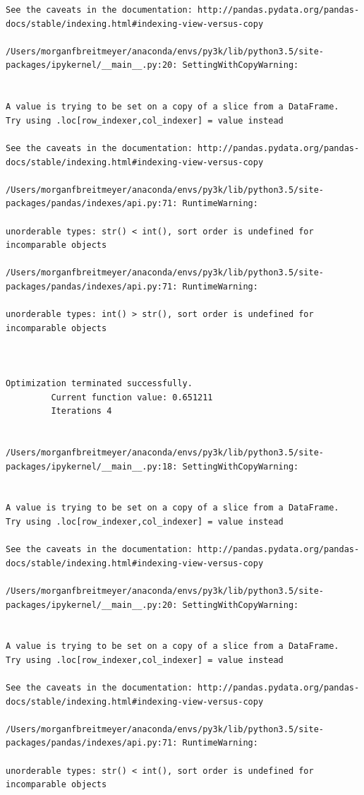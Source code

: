 \begin{lstlisting}
See the caveats in the documentation: http://pandas.pydata.org/pandas-docs/stable/indexing.html#indexing-view-versus-copy

/Users/morganfbreitmeyer/anaconda/envs/py3k/lib/python3.5/site-packages/ipykernel/__main__.py:20: SettingWithCopyWarning:


A value is trying to be set on a copy of a slice from a DataFrame.
Try using .loc[row_indexer,col_indexer] = value instead

See the caveats in the documentation: http://pandas.pydata.org/pandas-docs/stable/indexing.html#indexing-view-versus-copy

/Users/morganfbreitmeyer/anaconda/envs/py3k/lib/python3.5/site-packages/pandas/indexes/api.py:71: RuntimeWarning:

unorderable types: str() < int(), sort order is undefined for incomparable objects

/Users/morganfbreitmeyer/anaconda/envs/py3k/lib/python3.5/site-packages/pandas/indexes/api.py:71: RuntimeWarning:

unorderable types: int() > str(), sort order is undefined for incomparable objects



Optimization terminated successfully.
         Current function value: 0.651211
         Iterations 4


/Users/morganfbreitmeyer/anaconda/envs/py3k/lib/python3.5/site-packages/ipykernel/__main__.py:18: SettingWithCopyWarning:


A value is trying to be set on a copy of a slice from a DataFrame.
Try using .loc[row_indexer,col_indexer] = value instead

See the caveats in the documentation: http://pandas.pydata.org/pandas-docs/stable/indexing.html#indexing-view-versus-copy

/Users/morganfbreitmeyer/anaconda/envs/py3k/lib/python3.5/site-packages/ipykernel/__main__.py:20: SettingWithCopyWarning:


A value is trying to be set on a copy of a slice from a DataFrame.
Try using .loc[row_indexer,col_indexer] = value instead

See the caveats in the documentation: http://pandas.pydata.org/pandas-docs/stable/indexing.html#indexing-view-versus-copy

/Users/morganfbreitmeyer/anaconda/envs/py3k/lib/python3.5/site-packages/pandas/indexes/api.py:71: RuntimeWarning:

unorderable types: str() < int(), sort order is undefined for incomparable objects


\end{lstlisting}
